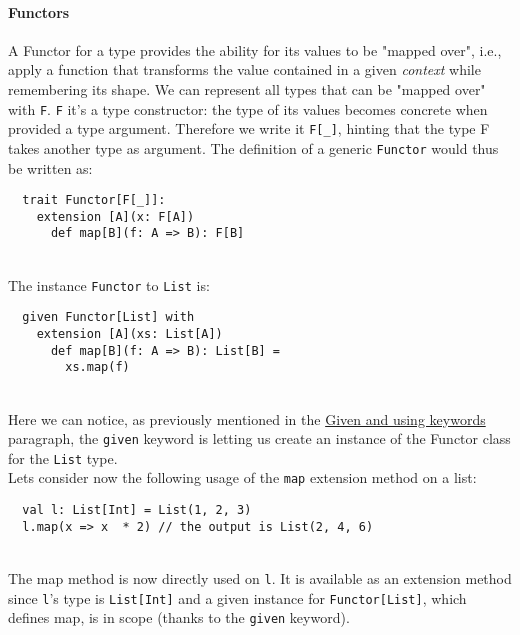 \paragraph{Functors}
A Functor for a type provides the ability for its values to be "mapped over", i.e., apply a function that transforms the value contained in a given \textit{context} while remembering its shape.
We can represent all types that can be "mapped over" with \texttt{F}.
\texttt{F} it's a type constructor: the type of its values becomes concrete when provided a type argument.
Therefore we write it \texttt{F[\_]}, hinting that the type F takes another type as argument.
The definition of a generic \texttt{Functor} would thus be written as:
\begin{verbatim}
  trait Functor[F[_]]:
    extension [A](x: F[A])
      def map[B](f: A => B): F[B]
\end{verbatim}\mbox{}\\
The instance \texttt{Functor} to \texttt{List} is:
\begin{verbatim}
  given Functor[List] with
    extension [A](xs: List[A])
      def map[B](f: A => B): List[B] =
        xs.map(f)
\end{verbatim}\mbox{}\\
Here we can notice, as previously mentioned in the \hyperref[par:given-using]{Given and using keywords} paragraph, the \texttt{given} keyword is letting us create an instance of the Functor class for the \texttt{List} type.\\
Lets consider now the following usage of the \texttt{map} extension method on a list:
\begin{verbatim}
  val l: List[Int] = List(1, 2, 3)
  l.map(x => x  * 2) // the output is List(2, 4, 6)
\end{verbatim}\mbox{}\\
The map method is now directly used on \texttt{l}. It is available as an extension method since \texttt{l}'s type is \texttt{List[Int]} and a given instance for \texttt{Functor[List]}, which defines map, is in scope (thanks to the \texttt{given} keyword).

